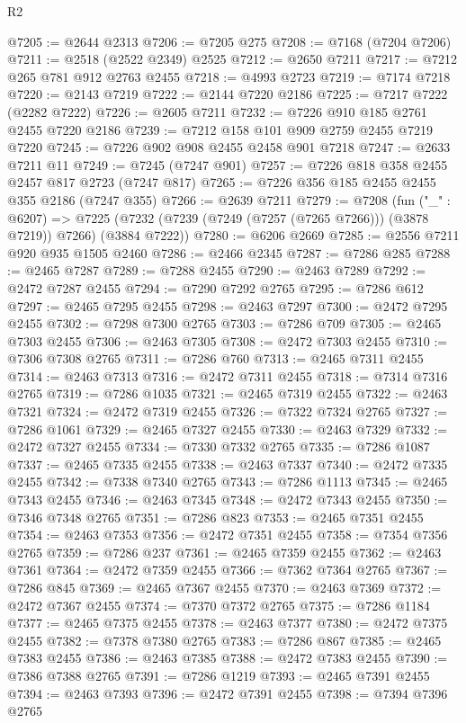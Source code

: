 \begin{lexlean}{R2}
\begin{coremodule}
@7205 := @2644 @2313
@7206 := @7205 @275
@7208 := @7168 (@7204 @7206)
@7211 := @2518 (@2522 @2349) @2525
@7212 := @2650 @7211
@7217 := @7212 @265 @781 @912 @2763 @2455
@7218 := @4993 @2723
@7219 := @7174 @7218
@7220 := @2143 @7219
@7222 := @2144 @7220 @2186
@7225 := @7217 @7222 (@2282 @7222)
@7226 := @2605 @7211
@7232 := @7226 @910 @185 @2761 @2455 @7220 @2186
@7239 := @7212 @158 @101 @909 @2759 @2455 @7219 @7220
@7245 := @7226 @902 @908 @2455 @2458 @901 @7218
@7247 := @2633 @7211 @11
@7249 := @7245 (@7247 @901)
@7257 := @7226 @818 @358 @2455 @2457 @817 @2723 (@7247 @817)
@7265 := @7226 @356 @185 @2455 @2455 @355 @2186 (@7247 @355)
@7266 := @2639 @7211
@7279 := @7208
    (fun ("_" : @6207) =>
    @7225 (@7232 (@7239 (@7249 (@7257 (@7265 @7266))) (@3878 @7219)) @7266) (@3884 @7222))
@7280 := @6206 @2669
@7285 := @2556 @7211 @920 @935 @1505 @2460
@7286 := @2466 @2345
@7287 := @7286 @285
@7288 := @2465 @7287
@7289 := @7288 @2455
@7290 := @2463 @7289
@7292 := @2472 @7287 @2455
@7294 := @7290 @7292 @2765
@7295 := @7286 @612
@7297 := @2465 @7295 @2455
@7298 := @2463 @7297
@7300 := @2472 @7295 @2455
@7302 := @7298 @7300 @2765
@7303 := @7286 @709
@7305 := @2465 @7303 @2455
@7306 := @2463 @7305
@7308 := @2472 @7303 @2455
@7310 := @7306 @7308 @2765
@7311 := @7286 @760
@7313 := @2465 @7311 @2455
@7314 := @2463 @7313
@7316 := @2472 @7311 @2455
@7318 := @7314 @7316 @2765
@7319 := @7286 @1035
@7321 := @2465 @7319 @2455
@7322 := @2463 @7321
@7324 := @2472 @7319 @2455
@7326 := @7322 @7324 @2765
@7327 := @7286 @1061
@7329 := @2465 @7327 @2455
@7330 := @2463 @7329
@7332 := @2472 @7327 @2455
@7334 := @7330 @7332 @2765
@7335 := @7286 @1087
@7337 := @2465 @7335 @2455
@7338 := @2463 @7337
@7340 := @2472 @7335 @2455
@7342 := @7338 @7340 @2765
@7343 := @7286 @1113
@7345 := @2465 @7343 @2455
@7346 := @2463 @7345
@7348 := @2472 @7343 @2455
@7350 := @7346 @7348 @2765
@7351 := @7286 @823
@7353 := @2465 @7351 @2455
@7354 := @2463 @7353
@7356 := @2472 @7351 @2455
@7358 := @7354 @7356 @2765
@7359 := @7286 @237
@7361 := @2465 @7359 @2455
@7362 := @2463 @7361
@7364 := @2472 @7359 @2455
@7366 := @7362 @7364 @2765
@7367 := @7286 @845
@7369 := @2465 @7367 @2455
@7370 := @2463 @7369
@7372 := @2472 @7367 @2455
@7374 := @7370 @7372 @2765
@7375 := @7286 @1184
@7377 := @2465 @7375 @2455
@7378 := @2463 @7377
@7380 := @2472 @7375 @2455
@7382 := @7378 @7380 @2765
@7383 := @7286 @867
@7385 := @2465 @7383 @2455
@7386 := @2463 @7385
@7388 := @2472 @7383 @2455
@7390 := @7386 @7388 @2765
@7391 := @7286 @1219
@7393 := @2465 @7391 @2455
@7394 := @2463 @7393
@7396 := @2472 @7391 @2455
@7398 := @7394 @7396 @2765

\end{coremodule}
\end{lexlean}
